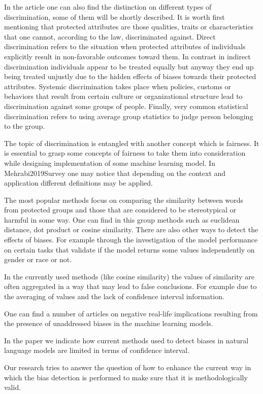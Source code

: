 \documentclass[
]{book}
\begin{document}
In the article one can also find the distinction on different types of discrimination, some of them will be shortly described. It is worth first mentioning that protected attributes are those qualities, traits or characteristics that one cannot, according to the law, discriminated against.
Direct discrimination refers to the situation when protected attributes of individuals explicitly result in non-favorable outcomes toward them. In contrast in indirect discrimination individuals appear to be treated equally but anyway they end up being treated unjustly due to the hidden effects of biases towards their protected attributes. Systemic discrimination takes place when policies, customs or behaviors that result from certain culture or organizational structure lead to discrimination against some groups of people. Finally, very common statistical discrimination refers to using
average group statistics to judge person belonging to the group.

The topic of discrimination is entangled with another concept which is fairness. It is essential to grasp some concepts of fairness to take them into
consideration while designing implementation of some machine learning model. In Mehrabi2019Survey one may notice that depending on the context and application different definitions may be applied.

The most popular methods focus on comparing the similarity between words from protected groups and those that are considered to be stereotypical or harmful in some way. One can find in this group methods such as euclidean distance, dot product or cosine similarity. There are also other ways to detect the effects of biases. For example through the investigation of the model performance on certain tasks that validate if the model returns some values
independently on gender or race or not.

In the currently used methods (like cosine similarity) the values of similarity are often aggregated in a way that may lead to false conclusions. For
example due to the averaging of values and the lack of confidence interval information.

One can find a number of articles on negative real-life implications resulting from the presence of unaddressed biases in the machine learning models.

In the paper we indicate how current methods used to detect biases in natural language models are limited in terms of confidence interval.

Our research tries to answer the question of how to enhance the current way in which the bias detection is performed to make sure that it is
methodologically valid.
\end{document}
